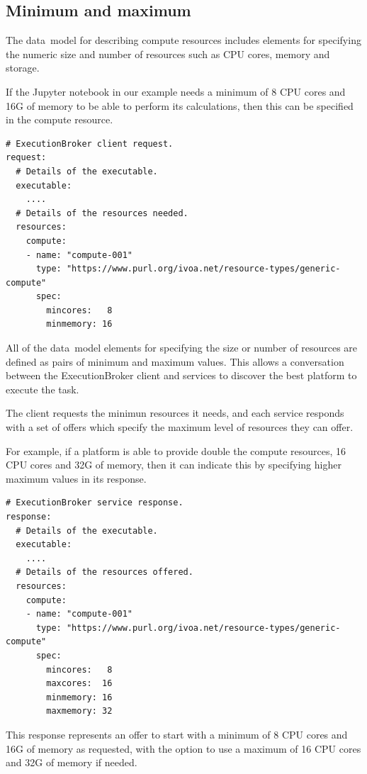 \documentclass[11pt,a4paper]{ivoa}
\newcommand{\datamodel} {data~model}
\newcommand{\execbrokerclass} {ExecutionBroker}
\newcommand{\jupyternotebook} {Jupyter notebook}
\newcommand{\cpu} {CPU}
\begin{document}
\subsection{Minimum and maximum}
\label{minandmax}

The \datamodel{} for describing compute resources includes elements for specifying the numeric size
and number of resources such as \cpu{} cores, memory and storage.

If the \jupyternotebook{} in our example needs a minimum of 8 \cpu{} cores and 16G of memory
to be able to perform its calculations, then this can be specified in the compute resource.

\begin{lstlisting}[]
# ExecutionBroker client request.
request:
  # Details of the executable.
  executable:
    ....
  # Details of the resources needed.
  resources:
    compute:
    - name: "compute-001"
      type: "https://www.purl.org/ivoa.net/resource-types/generic-compute"
      spec:
        mincores:   8
        minmemory: 16
\end{lstlisting}

All of the \datamodel{} elements for specifying the size or number of resources are defined
as pairs of minimum and maximum values.
This allows a conversation between the \execbrokerclass{} client and services
to discover the best platform to execute the task.

The client requests the minimun resources it needs,
and each service responds with a set of offers which specify the maximum
level of resources they can offer.

For example, if a platform is able to provide double the compute resources,
16 \cpu{} cores and 32G of memory,
then it can indicate this by specifying higher maximum values in its response.

\begin{lstlisting}[]
# ExecutionBroker service response.
response:
  # Details of the executable.
  executable:
    ....
  # Details of the resources offered.
  resources:
    compute:
    - name: "compute-001"
      type: "https://www.purl.org/ivoa.net/resource-types/generic-compute"
      spec:
        mincores:   8
        maxcores:  16
        minmemory: 16
        maxmemory: 32
\end{lstlisting}

This response represents an offer to start with a minimum of 8 \cpu{} cores and 16G of memory
as requested, with the option to use a maximum of 16 \cpu{} cores and 32G of memory if needed.
\end{document}
